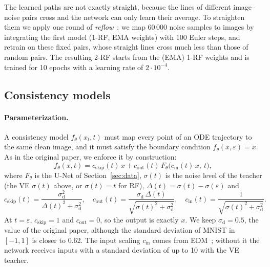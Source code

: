\documentclass{article}
\begin{document}
The learned paths are not exactly straight, because the lines of different
image--noise pairs cross and the network can only learn their average. To
straighten them we apply one round of \emph{reflow}~\cite{liu2023flow}: we
map 60\,000 noise samples to images by integrating the first model (1-RF, EMA
weights) with 100 Euler steps, and retrain on these fixed pairs, whose
straight lines cross much less than those of random pairs. The resulting 2-RF
starts from the (EMA) 1-RF weights and is trained for 10 epochs with a learning
rate of $2\cdot10^{-4}$.

\subsection{Consistency models}
\label{sec:cm}

\paragraph{Parameterization.} A consistency model $f_\theta(x_t, t)$ must map
every point of an ODE trajectory to the same clean image, and it must satisfy
the boundary condition $f_\theta(x, \varepsilon) = x$. As in the original
paper, we enforce it by construction:
\begin{equation}
  f_\theta(x, t) = c_\text{skip}(t)\, x + c_\text{out}(t)\, F_\theta\big(c_\text{in}(t)\, x,\ t\big),
\end{equation}
where $F_\theta$ is the U-Net of Section~\ref{sec:data}, $\sigma(t)$ is the
noise level of the teacher (the VE $\sigma(t)$ above, or $\sigma(t) = t$ for
RF), $\Delta(t) = \sigma(t) - \sigma(\varepsilon)$ and
\begin{equation}
  c_\text{skip}(t) = \frac{\sigma_\text{d}^2}{\Delta(t)^2 + \sigma_\text{d}^2}, \quad
  c_\text{out}(t) = \frac{\sigma_\text{d}\,\Delta(t)}{\sqrt{\sigma(t)^2 + \sigma_\text{d}^2}}, \quad
  c_\text{in}(t) = \frac{1}{\sqrt{\sigma(t)^2 + \sigma_\text{d}^2}}.
\end{equation}
At $t = \varepsilon$, $c_\text{skip} = 1$ and $c_\text{out} = 0$, so the output
is exactly $x$. We keep $\sigma_\text{d} = 0.5$, the value of the original
paper, although the standard deviation of MNIST in $[-1, 1]$ is closer to
0.62. The input scaling $c_\text{in}$ comes from EDM~\cite{karras2022edm};
without it the network receives inputs with a standard deviation of up to 10
with the VE teacher.
\end{document}
